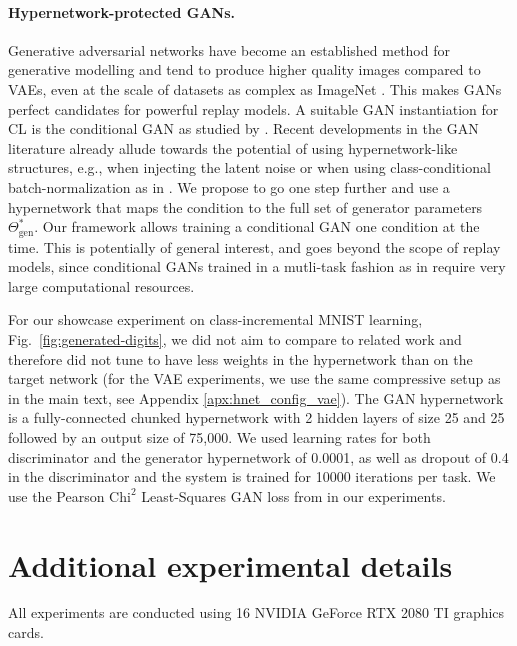\documentclass{article}
\begin{document}
\paragraph{Hypernetwork-protected GANs.} \label{apx:hnet_config_gan} Generative adversarial networks \citep{goodfellow2014generative} have become an established method for generative modelling and tend to produce higher quality images compared to VAEs, even at the scale of datasets as complex as ImageNet \citep{biggan, semi:supervised:cgan:imagenet, unsupervised:gan:imagenet}. This makes GANs perfect candidates for powerful replay models. A suitable GAN instantiation for CL is the conditional GAN \citep{conditional:gan} as studied by \citet{wu_memory_2018}. Recent developments in the GAN literature already allude towards the potential of using hypernetwork-like structures, e.g., when injecting the latent noise \citep{karras2019style} or when using class-conditional batch-normalization as in \citep{biggan}. We propose to go one step further and use a hypernetwork that maps the condition to the full set of generator parameters $\Theta_\text{gen}^*$. Our framework allows training a conditional GAN one condition at the time. This is potentially of general interest, and goes beyond the scope of replay models, since conditional GANs trained in a mutli-task fashion as in \cite{biggan} require very large computational resources. 

For our showcase experiment on class-incremental MNIST learning, Fig.~\ref{fig:generated-digits}, we did not aim to compare to related work and therefore did not tune 
to have less weights in the hypernetwork than on the target network (for the VAE experiments, we use the same compressive setup as in the main text, see Appendix \ref{apx:hnet_config_vae}). The GAN hypernetwork is a fully-connected chunked hypernetwork with 2 hidden layers of size 25 and 25 followed by an output size of 75,000. We used learning rates for both discriminator and the generator hypernetwork of 0.0001, as well as dropout of 0.4 in the discriminator and the system is trained for 10000 iterations per task. 
We use the Pearson $\text{Chi}^2$ Least-Squares GAN loss from \citet{lsgan} in our experiments.


\section{Additional experimental details}
\label{apx:extra-details}

All experiments are conducted using 16 NVIDIA GeForce RTX 2080 TI graphics cards.
\end{document}
